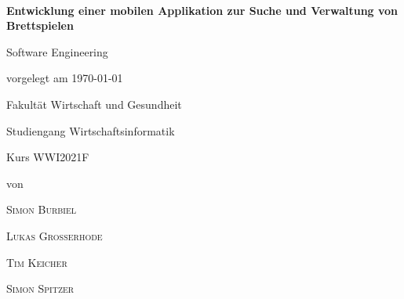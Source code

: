 \newcommand{\typMeinerArbeit}{Software Engineering} 

\newcommand{\themaMeinerArbeit}{Entwicklung einer mobilen Applikation zur Suche und Verwaltung von Brettspielen}

\newcommand{\meinNameSB}{Simon Burbiel}
\newcommand{\meinNameLG}{Lukas Großerhode}
\newcommand{\meinNameSS}{Simon Spitzer}
\newcommand{\meinNameTK}{Tim Keicher}

\thispagestyle{empty}

\begin{spacing}{1}
\begin{center}	
~\vspace{0mm}

{\sffamily
\LARGE  
\textbf{Entwicklung einer mobilen Applikation zur Suche und Verwaltung von Brettspielen}

}


\vspace{15mm}

{\Large \typMeinerArbeit}

\vspace{1cm}

vorgelegt am \today 

\vspace{15mm}

Fakultät Wirtschaft und Gesundheit
\medskip

Studiengang Wirtschaftsinformatik
\medskip

Kurs WWI2021F 

\vspace{10mm}

von

\vspace{10mm}

{\large\textsc{\meinNameSB}}
\medskip

{\large\textsc{\meinNameLG}}
\medskip

{\large\textsc{\meinNameTK}}
\medskip

{\large\textsc{\meinNameSS}}
\medskip

\vspace{10mm}
\end{center}

\vfill




\vspace{1cm}
\end{spacing}

